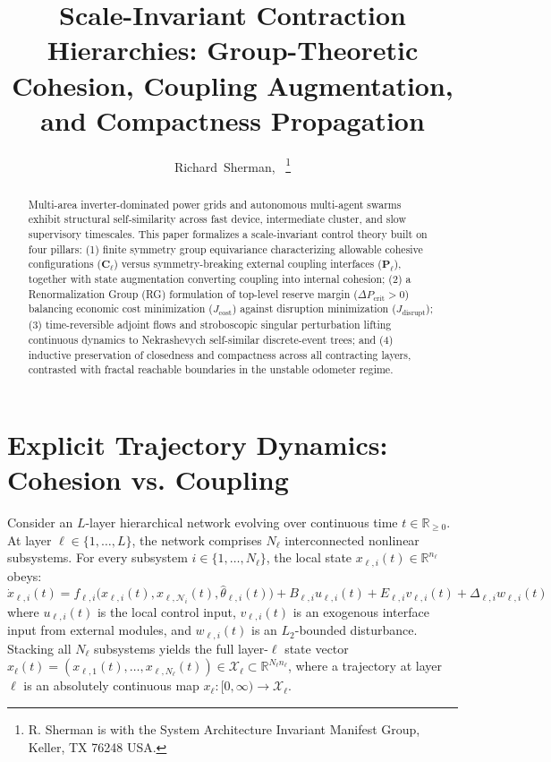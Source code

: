 \documentclass[journal]{IEEEtran}
\title{Scale-Invariant Contraction Hierarchies: Group-Theoretic Cohesion, Coupling Augmentation, and Compactness Propagation}
\author{Richard~Sherman,~\IEEEmembership{Member,~IEEE}%
\thanks{R. Sherman is with the System Architecture Invariant Manifest Group, Keller, TX 76248 USA.}}
\begin{document}
\maketitle

\begin{abstract}
Multi-area inverter-dominated power grids and autonomous multi-agent swarms exhibit structural self-similarity across fast device, intermediate cluster, and slow supervisory timescales. This paper formalizes a scale-invariant control theory built on four pillars: (1) finite symmetry group equivariance characterizing allowable cohesive configurations ($\mathbf{C}_\ell$) versus symmetry-breaking external coupling interfaces ($\mathbf{P}_\ell$), together with state augmentation converting coupling into internal cohesion; (2) a Renormalization Group (RG) formulation of top-level reserve margin ($\Delta P_{\text{crit}} > 0$) balancing economic cost minimization ($J_{\text{cost}}$) against disruption minimization ($J_{\text{disrupt}}$); (3) time-reversible adjoint flows and stroboscopic singular perturbation lifting continuous dynamics to Nekrashevych self-similar discrete-event trees; and (4) inductive preservation of closedness and compactness across all contracting layers, contrasted with fractal reachable boundaries in the unstable odometer regime.
\end{abstract}

\section{Explicit Trajectory Dynamics: Cohesion vs. Coupling}
Consider an $L$-layer hierarchical network evolving over continuous time $t \in \mathbb{R}_{\ge 0}$. At layer $\ell \in \{1, \dots, L\}$, the network comprises $N_\ell$ interconnected nonlinear subsystems. For every subsystem $i \in \{1, \dots, N_\ell\}$, the local state $x_{\ell,i}(t) \in \mathbb{R}^{n_\ell}$ obeys:
\begin{equation}
\dot{x}_{\ell,i}(t) = f_{\ell,i}\big(x_{\ell,i}(t), x_{\ell,\mathcal{N}_i}(t), \hat{\theta}_{\ell,i}(t)\big) + B_{\ell,i} u_{\ell,i}(t) + E_{\ell,i} v_{\ell,i}(t) + \Delta_{\ell,i} w_{\ell,i}(t)
\end{equation}
where $u_{\ell,i}(t)$ is the local control input, $v_{\ell,i}(t)$ is an exogenous interface input from external modules, and $w_{\ell,i}(t)$ is an $L_2$-bounded disturbance. Stacking all $N_\ell$ subsystems yields the full layer-$\ell$ state vector $x_\ell(t) = (x_{\ell,1}(t), \dots, x_{\ell,N_\ell}(t)) \in \mathcal{X}_\ell \subset \mathbb{R}^{N_\ell n_\ell}$, where a trajectory at layer $\ell$ is an absolutely continuous map $x_\ell : [0, \infty) \to \mathcal{X}_\ell$.
\end{document}

